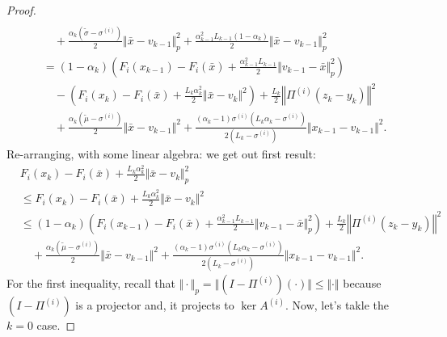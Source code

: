 \documentclass[12pt]{article}
\begin{document}
\begin{proof}
{\begin{align*}
                \\ &\quad 
                + \frac{\alpha_k(\tilde\sigma - \sigma^{(i)})}{2} \Vert \bar x - v_{k - 1}\Vert^2_p
                + \frac{\alpha_{k - 1}^2L_{k - 1}(1 - \alpha_k)}{2} \Vert \bar x - v_{k - 1}\Vert^2_p
            \\
            &= (1 - \alpha_k)\left(
                F_i(x_{k - 1}) - F_i(\bar x) + \frac{\alpha_{k - 1}^2L_{k - 1}}{2}\Vert v_{k - 1} - \bar x\Vert^2_p
            \right) 
                \\ & \quad
                - \left(
                    F_i(x_{k}) - F_i(\bar x) + \frac{L_k\alpha_k^2}{2}\Vert \bar x - v_k\Vert^2 
                \right) + \frac{L_k}{2}\left\Vert \Pi^{(i)}(z_k - y_k)\right\Vert^2
                \\ &\quad 
                + \frac{\alpha_k(\tilde\mu - \sigma^{(i)})}{2}\Vert \bar x - v_{k - 1}\Vert^2
                + \frac{(\alpha_k - 1)\sigma^{(i)}\left(L_k\alpha_k - \sigma^{(i)}\right)}{2\left(L_k - \sigma^{(i)}\right)}\Vert x_{k - 1} - v_{k - 1} \Vert^2.
        \end{align*}
        }
        Re-arranging, with some linear algebra:  we get out first result: 
        \begin{align*}
            &F_i(x_{k}) - F_i(\bar x) + \frac{L_k\alpha_k^2}{2}\Vert \bar x - v_k\Vert^2_p 
            \\
            &\le 
            F_i(x_{k}) - F_i(\bar x) + \frac{L_k\alpha_k^2}{2}\Vert \bar x - v_k\Vert^2 
            \\
            &\le 
            (1 - \alpha_k)\left(
                F_i(x_{k - 1}) - F_i(\bar x) + \frac{\alpha_{k - 1}^2L_{k - 1}}{2}\Vert v_{k - 1} - \bar x\Vert^2_p
            \right)     
            + \frac{L_k}{2}\left\Vert \Pi^{(i)}(z_k - y_k)\right\Vert^2
                \\ &\quad 
                + \frac{\alpha_k(\tilde\mu - \sigma^{(i)})}{2}\Vert \bar x - v_{k - 1}\Vert^2
                + \frac{(\alpha_k - 1)\sigma^{(i)}\left(L_k\alpha_k - \sigma^{(i)}\right)}{2\left(L_k - \sigma^{(i)}\right)}\Vert x_{k - 1} - v_{k - 1} \Vert^2.
        \end{align*}
        For the first inequality, recall that $\Vert \cdot\Vert_p = \Vert (I - \Pi^{(i)})(\cdot)\Vert \le \Vert \cdot\Vert$ because $(I - \Pi^{(i)})$ is a projector and, it projects to $\ker A^{(i)}$. 
        Now, let's takle the $k = 0$ case. 
        \par

\end{proof}
\end{document}
